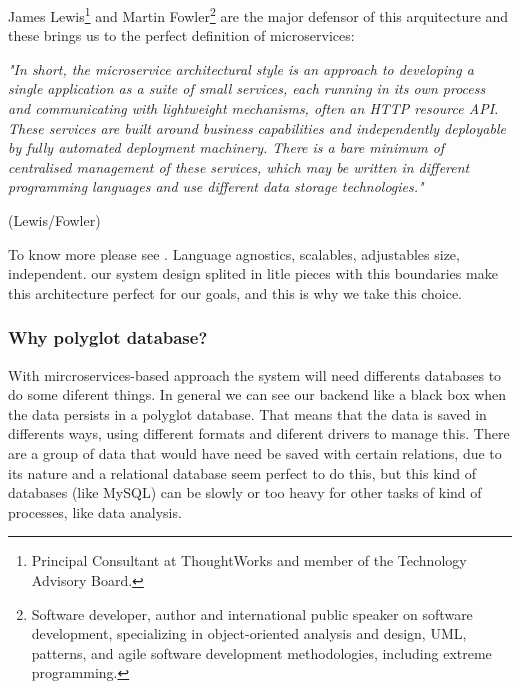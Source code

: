 \noindent James Lewis\footnote{Principal Consultant at ThoughtWorks and
member of the Technology Advisory Board.} and Martin Fowler\footnote{Software developer,
author and international public speaker on software development, specializing in
object-oriented analysis and design, UML, patterns, and agile software development
methodologies, including extreme programming.} are the major defensor of this
arquitecture and these brings us to the perfect definition of microservices:
\bigskip

\begin{minipage}{0.9\linewidth}
        \vspace{5pt}
        {\small
        \textit{"In short, the microservice architectural style is an approach to developing a
        single application as a suite of small services, each running in its own process
        and communicating with lightweight mechanisms, often an HTTP resource API.
        These services are built around business capabilities and independently deployable
        by fully automated deployment machinery. There is a bare minimum of centralised management
        of these services, which may be written in different programming languages and
        use different data storage technologies."}
        }
        \begin{flushright}
            (Lewis/Fowler)
        \end{flushright}
        \vspace{5pt}
    \end{minipage}

To know more please see \cite{Fowler14Micro}.
\intro
Language agnostics, scalables, adjustables size, independent. our system design
splited in litle pieces with this boundaries make this architecture perfect for
our goals, and this is why we take this choice.

\subsubsection{Why polyglot database?}

With mircroservices-based approach the system will need differents databases to do
some diferent things. In general we can see our
backend like a black box when the data persists in a polyglot database.
That means that the data is saved in differents ways, using different
formats and diferent drivers to manage this. There are a group of
data that would have need be saved with certain relations, due to its nature
and a relational database seem perfect to do this, but this kind of
databases (like MySQL) can be slowly or too heavy for other tasks
of kind of processes, like data analysis.


